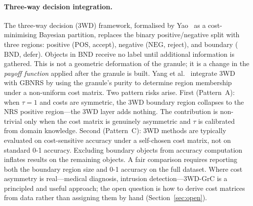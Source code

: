\paragraph{Three-way decision integration.}
The three-way decision (3WD) framework, formalised by
Yao~\cite{Yao2010threeway} as a cost-minimising Bayesian partition, replaces
the binary positive/negative split with three regions: positive ($\mathrm{POS}$,
accept), negative ($\mathrm{NEG}$, reject), and boundary ($\mathrm{BND}$,
defer).  Objects in $\mathrm{BND}$ receive no label until additional information
is gathered.  This is not a geometric deformation of the granule; it is a
change in the \emph{payoff function} applied after the granule is built.
Yang et al.~\cite{Xia2024TFS3WC} integrate 3WD with GBNRS by using the
granule's purity to determine region membership under a non-uniform cost matrix.
Two pattern risks arise.
First (Pattern~A): when $\tau = 1$ and costs are symmetric, the 3WD boundary
region collapses to the NRS positive region---the 3WD layer adds nothing.
The contribution is non-trivial only when the cost matrix is genuinely
asymmetric and $\tau$ is calibrated from domain knowledge.
Second (Pattern~C): 3WD methods are typically evaluated on cost-sensitive
accuracy under a self-chosen cost matrix, not on standard 0-1 accuracy.
Excluding boundary objects from accuracy computation inflates results on the
remaining objects.  A fair comparison requires reporting both the boundary
region size and 0-1 accuracy on the full dataset.
Where cost asymmetry is real---medical diagnosis, intrusion detection---3WD-GrC
is a principled and useful approach; the open question is how to derive cost
matrices from data rather than assigning them by hand
(Section~\ref{sec:open}).
